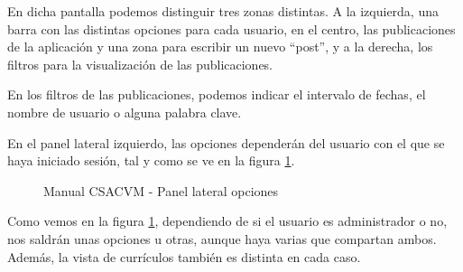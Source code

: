En dicha pantalla podemos distinguir tres zonas distintas. A la izquierda, una barra con las distintas opciones para cada usuario, en el centro, las publicaciones de la aplicación y una zona para escribir un nuevo ``post'', y a la derecha, los filtros para la visualización de las publicaciones.

En los filtros de las publicaciones, podemos indicar el intervalo de fechas, el nombre de usuario o alguna palabra clave.

En el panel lateral izquierdo, las opciones dependerán del usuario con el que se haya iniciado sesión, tal y como se ve en la figura \ref{manualLayout}. 
\begin{figure}
    \centering
    \caption{Manual CSACVM - Panel lateral opciones}
    \label{manualLayout}
\end{figure}

Como vemos en la figura \ref{manualLayout}, dependiendo de si el usuario es administrador o no, nos saldrán unas opciones u otras, aunque haya varias que compartan ambos. Además, la vista de currículos también es distinta en cada caso.


